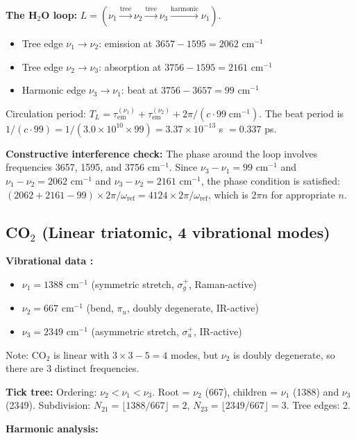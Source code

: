 \documentclass[11pt,twocolumn,a4paper]{article}
\theoremstyle{definition}
\theoremstyle{remark}
\newcommand{\tem}{\tau_{\mathrm{em}}}
\begin{document}
\textbf{The H$_2$O loop:} $L = (\nu_1 \xrightarrow{\text{tree}} \nu_2 \xrightarrow{\text{tree}} \nu_3 \xrightarrow{\text{harmonic}} \nu_1)$.
\begin{itemize}[nosep]
\item Tree edge $\nu_1 \to \nu_2$: emission at $3657 - 1595 = 2062$ cm$^{-1}$
\item Tree edge $\nu_2 \to \nu_3$: absorption at $3756 - 1595 = 2161$ cm$^{-1}$
\item Harmonic edge $\nu_3 \to \nu_1$: beat at $3756 - 3657 = 99$ cm$^{-1}$
\end{itemize}

Circulation period: $T_L = \tem^{(\nu_1)} + \tem^{(\nu_2)} + 2\pi/(c \cdot 99 \;\text{cm}^{-1})$. The beat period is $1/(c \cdot 99) = 1/(3.0 \times 10^{10} \times 99) = 3.37 \times 10^{-13}$ s $= 0.337$ ps.

\textbf{Constructive interference check:} The phase around the loop involves frequencies 3657, 1595, and 3756 cm$^{-1}$. Since $\nu_3 - \nu_1 = 99$ cm$^{-1}$ and $\nu_1 - \nu_2 = 2062$ cm$^{-1}$ and $\nu_3 - \nu_2 = 2161$ cm$^{-1}$, the phase condition is satisfied: $(2062 + 2161 - 99) \times 2\pi/\omega_{\mathrm{ref}} = 4124 \times 2\pi/\omega_{\mathrm{ref}}$, which is $2\pi n$ for appropriate $n$.

\subsection{CO$_2$ (Linear triatomic, 4 vibrational modes)}

\textbf{Vibrational data \citep{shimanouchi1972, nist_webbook}:}
\begin{itemize}[nosep]
\item $\nu_1 = 1388$ cm$^{-1}$ (symmetric stretch, $\sigma_g^+$, Raman-active)
\item $\nu_2 = 667$ cm$^{-1}$ (bend, $\pi_u$, doubly degenerate, IR-active)
\item $\nu_3 = 2349$ cm$^{-1}$ (asymmetric stretch, $\sigma_u^+$, IR-active)
\end{itemize}
Note: CO$_2$ is linear with $3 \times 3 - 5 = 4$ modes, but $\nu_2$ is doubly degenerate, so there are 3 distinct frequencies.

\textbf{Tick tree:} Ordering: $\nu_2 < \nu_1 < \nu_3$. Root = $\nu_2$ (667), children = $\nu_1$ (1388) and $\nu_3$ (2349). Subdivision: $N_{21} = \lfloor 1388/667 \rfloor = 2$, $N_{23} = \lfloor 2349/667 \rfloor = 3$. Tree edges: 2.

\textbf{Harmonic analysis:}
\end{document}
